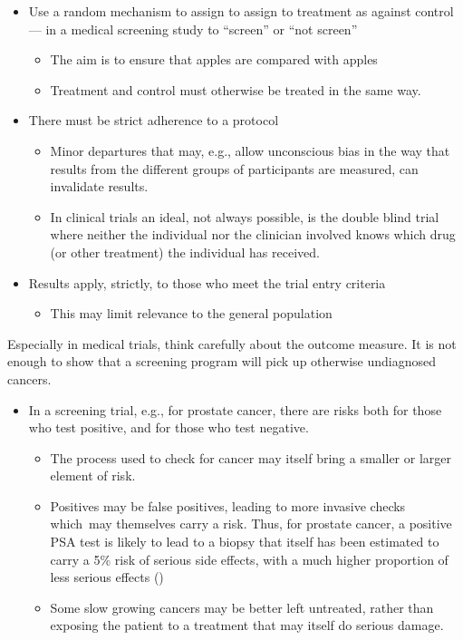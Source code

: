 \documentclass[
  10ptls,
  b5paper]{book}
\providecommand{\tightlist}{%
  \setlength{\itemsep}{0pt}\setlength{\parskip}{0pt}}
\begin{document}
\begin{itemize}
\tightlist
\item
  Use a random mechanism to assign to assign to treatment as against control --- in a medical screening study to ``screen'' or ``not screen''

  \begin{itemize}
  \tightlist
  \item
    The aim is to ensure that apples are compared with apples
  \item
    Treatment and control must otherwise be treated in the same way.
  \end{itemize}
\item
  There must be strict adherence to a protocol

  \begin{itemize}
  \tightlist
  \item
    Minor departures that may, e.g., allow unconscious bias in the way that results from the different groups of participants are measured, can invalidate results.
  \item
    In clinical trials an ideal, not always possible, is the double blind trial where neither the individual nor the clinician involved knows which drug (or other treatment) the individual has received.
  \end{itemize}
\item
  Results apply, strictly, to those who meet the trial entry criteria

  \begin{itemize}
  \tightlist
  \item
    This may limit relevance to the general population
  \end{itemize}
\end{itemize}

Especially in medical trials, think carefully about the outcome measure. It is not enough to show that a screening program will pick up otherwise undiagnosed cancers.

\begin{itemize}
\tightlist
\item
  In a screening trial, e.g., for prostate cancer, there are risks both for those who test positive, and for those who test negative.

  \begin{itemize}
  \tightlist
  \item
    The process used to check for cancer may itself bring a smaller or larger element of risk.
  \item
    Positives may be false positives, leading to more invasive checks which~may themselves carry a risk. Thus, for prostate cancer, a positive PSA test is likely to lead to a biopsy that itself has been estimated to carry a 5\% risk of serious side effects, with a much higher proportion of less serious effects ()
  \item
    Some slow growing cancers may be better left untreated, rather than exposing the patient to a treatment that may itself do serious damage.
  \end{itemize}
\end{itemize}
\end{document}
